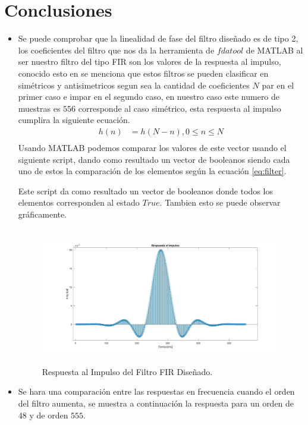 \documentclass[12pt]{article}
\begin{document}
\section{Conclusiones}
\begin{itemize}
    \item Se puede comprobar que la linealidad de fase del filtro diseñado es de tipo 2, los coeficientes del filtro que nos da la herramienta de $fdatool$ de MATLAB al ser nuestro filtro del tipo FIR son los valores de la respuesta al impulso, conocido esto en \cite{deergha2018digital} se menciona que estos filtros se pueden clasificar en simétricos y antisimetricos segun sea la cantidad de coeficientes $N$ par en el primer caso e impar en el segundo caso, en nuestro caso este numero de muestras es $556$ corresponde al caso simétrico, esta respuesta al impulso cumplira la siguiente ecuación.
    \begin{equation}
        \begin{split}
           h(n)&=h(N-n), 0\le n \le N \\ 
        \end{split}
        \label{eq:filter}
    \end{equation}
    Usando MATLAB podemos comparar los valores de este vector usando el siguiente script, dando como resultado un vector de booleanos siendo cada uno de estos la comparación de los elementos según la ecuación \ref{eq:filter}.
    
    Este script da como resultado un vector de booleanos donde todos los elementos corresponden al estado $True$.
    Tambien esto se puede observar gráficamente. 
\vspace{150mm}
    \begin{figure}[h]
        \centering
        \includegraphics[width=16cm, height=6cm]{imagenes/impulse.jpg}
        \caption{Respuesta al Impulso del Filtro FIR Diseñado.}
    \end{figure}
    \item Se hara una comparación entre las respuestas en frecuencia cuando el orden del filtro aumenta, se muestra a continuación la respuesta para un orden de $48$ y de orden $555$.

\end{itemize}
\end{document}
